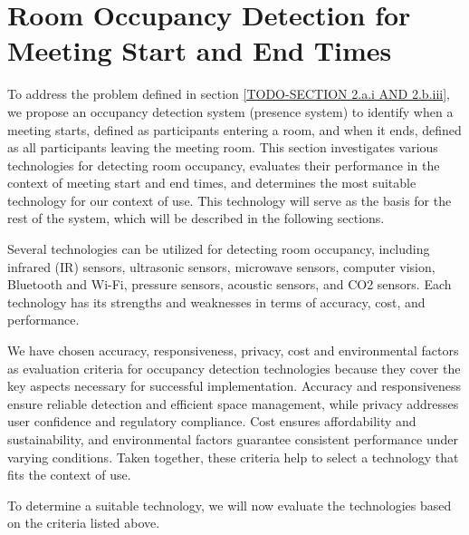 \section{\label{sec:presence_intro}Room Occupancy Detection for Meeting Start and End Times}

To address the problem defined in section \ref{TODO-SECTION 2.a.i AND 2.b.iii}, we propose an occupancy detection system (presence system) to identify when a meeting starts, defined as participants entering a room, and when it ends, defined as all participants leaving the meeting room.
This section investigates various technologies for detecting room occupancy, evaluates their performance in the context of meeting start and end times, and determines the most suitable technology for our context of use.
This technology will serve as the basis for the rest of the system, which will be described in the following sections.

Several technologies can be utilized for detecting room occupancy, including infrared (IR) sensors\cite{woodward-2021}\cite{dodierBuildingOccupancyDetection2006}\cite{OccupancySensorMotion}, ultrasonic sensors\cite{woodward-2021}\cite{dodierBuildingOccupancyDetection2006}\cite{OccupancySensorMotion}, microwave sensors\cite{woodward-2021}, computer vision\cite{co2sensor}\cite{longoAccurateOccupancyEstimation2019}\cite{OccupancySensorMotion}, Bluetooth and Wi-Fi\cite{teissedre-2019}, pressure sensors\cite{OccupancySensorMotion}, acoustic sensors\cite{OccupancySensorMotion}, and CO2 sensors\cite{co2sensor}\cite{longoAccurateOccupancyEstimation2019}\cite{jinSensingProxyOccupancy2015}.\cite{faragherLocationFingerprintingBluetooth2015}
Each technology has its strengths and weaknesses in terms of accuracy, cost, and performance.

We have chosen accuracy, responsiveness, privacy, cost and environmental factors as evaluation criteria for occupancy detection technologies because they cover the key aspects necessary for successful implementation.
Accuracy and responsiveness ensure reliable detection and efficient space management, while privacy addresses user confidence and regulatory compliance.
Cost ensures affordability and sustainability, and environmental factors guarantee consistent performance under varying conditions.
Taken together, these criteria help to select a technology that fits the context of use.

To determine a suitable technology, we will now evaluate the technologies based on the criteria listed above.

